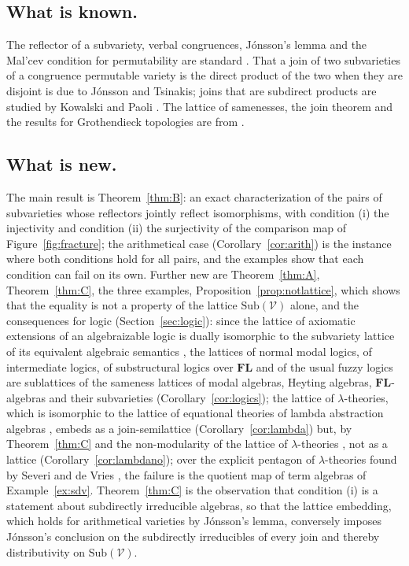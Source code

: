 \documentclass[11pt]{amsart}
\theoremstyle{definition}
\newcommand{\Sub}{\mathrm{Sub}}
\newcommand{\sV}{\mathcal V}
\begin{document}
\subsection*{What is known.}
The reflector of a subvariety, verbal congruences, Jónsson's lemma and the
Mal'cev condition for permutability are standard \cite{BS}. That a join of two
subvarieties of a congruence permutable variety is the direct product of the
two when they are disjoint is due to Jónsson and Tsinakis; joins that are
subdirect products are studied by Kowalski and Paoli \cite{KP}. The lattice of
samenesses, the join theorem and the results for Grothendieck topologies are
from \cite{Same,Postnikov,Topjoin,Finitejoin}.

\subsection*{What is new.}
The main result is Theorem~\ref{thm:B}: an exact characterization of the
pairs of subvarieties whose reflectors jointly reflect isomorphisms, with
condition (i) the injectivity and condition (ii) the surjectivity of the
comparison map of Figure~\ref{fig:fracture}; the arithmetical case
(Corollary~\ref{cor:arith}) is the instance where both conditions hold for
all pairs, and the examples show that each condition can fail on its own.
Further new are Theorem~\ref{thm:A}, Theorem~\ref{thm:C}, the three examples,
Proposition~\ref{prop:notlattice}, which shows that the equality is not a
property of the lattice $\Sub(\sV)$ alone, and the consequences for logic (Section~\ref{sec:logic}): since the lattice of
axiomatic extensions of an algebraizable logic is dually isomorphic to the
subvariety lattice of its equivalent algebraic semantics \cite{BP}, the lattices
of normal modal logics, of intermediate logics, of substructural logics over
$\mathbf{FL}$ and of the usual fuzzy logics are sublattices of the sameness
lattices of modal algebras, Heyting algebras, $\mathbf{FL}$-algebras and
their subvarieties (Corollary~\ref{cor:logics}); the lattice of
$\lambda$-theories, which is isomorphic to the lattice of equational theories
of lambda abstraction algebras \cite{Salibra00}, embeds as a join-semilattice
(Corollary~\ref{cor:lambda}) but, by Theorem~\ref{thm:C} and the
non-modularity of the lattice of $\lambda$-theories \cite{Salibra01}, not as
a lattice (Corollary~\ref{cor:lambdano}); over the explicit pentagon of
$\lambda$-theories found by Severi and de Vries \cite{SdV}, the failure is
the quotient map of term algebras of Example~\ref{ex:sdv}. Theorem~\ref{thm:C} is the
observation that condition (i) is a statement about subdirectly irreducible
algebras, so that the lattice embedding, which holds for arithmetical
varieties by Jónsson's lemma, conversely imposes Jónsson's conclusion on the
subdirectly irreducibles of every join and thereby distributivity on
$\Sub(\sV)$.
\end{document}
